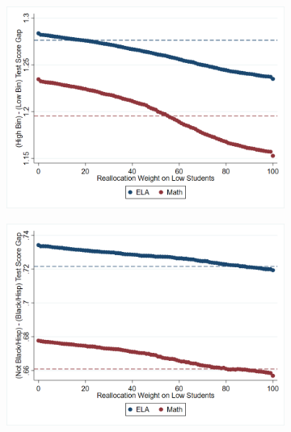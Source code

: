 \documentclass[12pt]{article}
\theoremstyle{definition}
\theoremstyle{definition}
\theoremstyle{definition}
\theoremstyle{definition}
\begin{document}
 \begin{figure}[H]
    \centering
      \centering
     \begin{subfigure}[b]{0.45\textwidth}
        \includegraphics[width=1\textwidth]{Working_Paper/WP_Figures/test_score_gaps.png}
    \end{subfigure}
   \begin{subfigure}[b]{0.45\textwidth}
        \includegraphics[width=1\textwidth]{Working_Paper/WP_Figures/race_gaps.png}
    \end{subfigure}
\end{figure}


\end{document}
